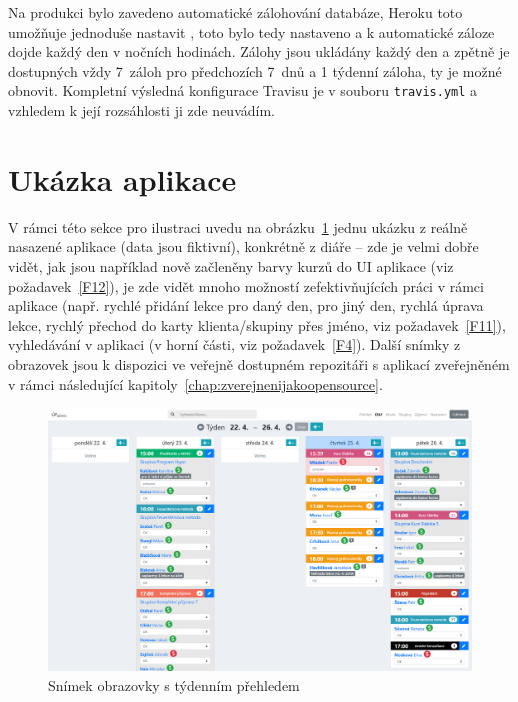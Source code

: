 Na produkci bylo zavedeno automatické zálohování databáze, Heroku toto umožňuje jednoduše nastavit \cite{heroku-backups}, toto bylo tedy nastaveno a k automatické záloze dojde každý den v nočních hodinách. Zálohy jsou ukládány každý den a zpětně je dostupných vždy 7~záloh pro předchozích 7~dnů a 1 týdenní záloha, ty je možné obnovit. Kompletní výsledná konfigurace Travisu je v souboru \verb|travis.yml| a vzhledem k její rozsáhlosti ji zde neuvádím.

\section{Ukázka aplikace}

V rámci této sekce pro ilustraci uvedu na obrázku~\ref{fig:screen-tyden} jednu ukázku z reálně nasazené aplikace (data jsou fiktivní), konkrétně z diáře -- zde je velmi dobře vidět, jak jsou například nově začleněny barvy kurzů do UI aplikace (viz požadavek~\ref{F12}), je zde vidět mnoho možností zefektivňujících práci v rámci aplikace (např. rychlé přidání lekce pro daný den, pro jiný den, rychlá úprava lekce, rychlý přechod do karty klienta/skupiny přes jméno, viz požadavek~\ref{F11}), vyhledávání v aplikaci (v horní části, viz požadavek~\ref{F4}). Další snímky z obrazovek jsou k dispozici ve veřejně dostupném repozitáři s aplikací zveřejněném v rámci následující kapitoly~\ref{chap:zverejnenijakoopensource}.

\begin{landscape}
    \begin{figure}\centering
    	\includegraphics[totalheight=0.83\textheight]{img/diary.png}
    	\caption{Snímek obrazovky s týdenním přehledem}\label{fig:screen-tyden}
    \end{figure}
\end{landscape}

